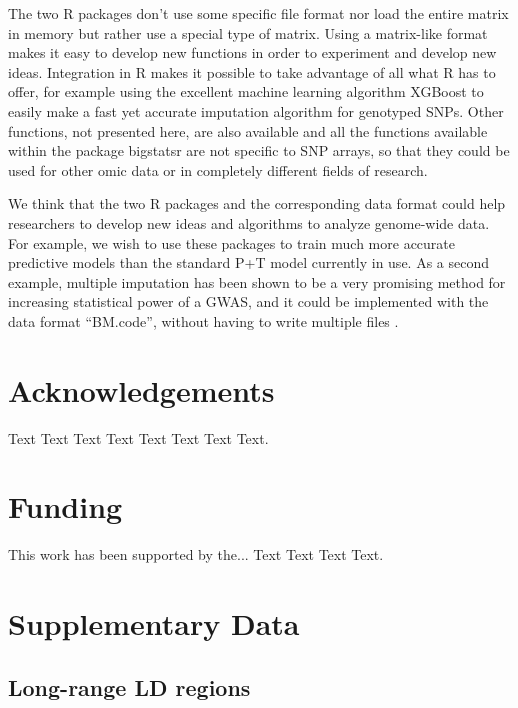 \documentclass{bioinfo}
\begin{document}
The two R packages don't use some specific file format nor load the entire matrix in memory but rather use a special type of matrix. Using a matrix-like format makes it easy to develop new functions in order to experiment and develop new ideas. Integration in R makes it possible to take advantage of all what R has to offer, for example using the excellent machine learning algorithm XGBoost to easily make a fast yet accurate imputation algorithm for genotyped SNPs. Other functions, not presented here, are also available and all the functions available within the package bigstatsr are not specific to SNP arrays, so that they could be used for other omic data or in completely different fields of research.

We think that the two R packages and the corresponding data format could help researchers to develop new ideas and algorithms to analyze genome-wide data. For example, we wish to use these packages to train much more accurate predictive models than the standard P+T model currently in use. As a second example, multiple imputation has been shown to be a very promising method for increasing statistical power of a GWAS, and it could be implemented with the data format ``BM.code'', without having to write multiple files \cite[]{Palmer2016}.



\section*{Acknowledgements}

Text Text Text Text Text Text  Text Text. 

\section*{Funding}

This work has been supported by the... Text Text  Text Text.\vspace*{-12pt}




\newpage
\section*{Supplementary Data}

\subsection{Long-range LD regions}
\end{document}
